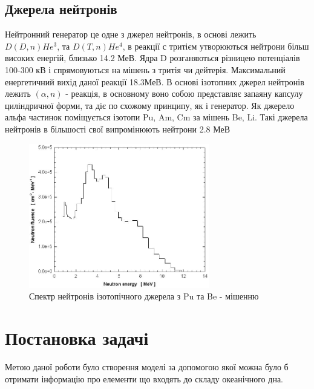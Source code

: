\documentclass[a4paper, 14pt]{article}
\numberwithin{equation}{section}
\numberwithin{table}{section}
\begin{document}
	\subsection{Джерела нейтронів}
	Нейтронний генератор це одне з джерел нейтронів, в основі лежить $D(D,n)He^3 $, та $D(T, n)He^4$, в реакції с тритієм утворюються нейтрони більш високих енергій, близько 14.2 МеВ. Ядра D розганяються різницею потенціалів 100-300 кВ і спрямовуються на мішень з тритія чи дейтерія. Максимальний енергетичний вихід даної реакції 18.3МеВ. 
	В основі ізотопних джерел нейтронів лежить $(\alpha, n)$ - реакція, в основному воно собою представляє запаяну капсулу циліндричної форми, та діє по схожому принципу, як і генератор. Як джерело альфа частинок поміщується ізотопи Pu, Am, Cm за мішень Be, Li. Такі джерела нейтронів в більшості свої випромінюють нейтрони 2.8 МеВ
	\begin{figure}[hbt!]
		\centering \includegraphics[width=0.7\textwidth]{images/239-PuBe-neutron-source-spectrum.png}
		\caption{Спектр нейтронів ізотопічного джерела з Pu та Be - мішенню} 
		\label{ris:neutron28Spectrum}	
	\end{figure}
	
	\newpage
	\section{Постановка задачі}
	\setcounter{figure}{0}
	Метою даної роботи було створення моделі за допомогою якої можна було б отримати інформацію про елементи що входять до складу океанічного дна.
\end{document}
